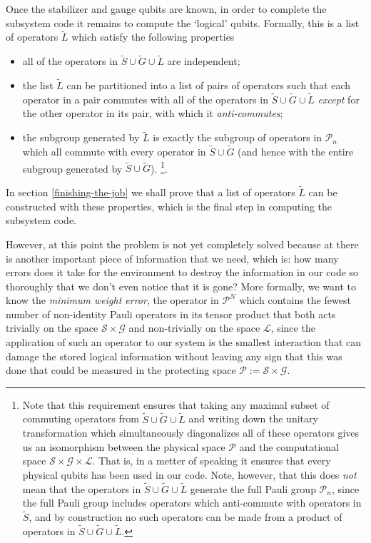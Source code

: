 \documentclass[twocolumn,showpacs,preprintnumbers,amsmath,amssymb,nofootinbib,pra,floatfix]{revtex4}
\begin{document}
Once the stabilizer and gauge qubits are known, in order to complete the subsystem code it remains to compute the `logical' qubits. Formally, this is a list of operators $\tilde L$ which satisfy the following properties
\begin{itemize}
\item all of the operators in $\tilde S \cup \tilde G \cup \tilde L$
  are independent;
\item the list $\tilde L$ can be partitioned into a list of pairs of
  operators such that each operator in a pair commutes with all of the
  operators in $\tilde S \cup \tilde G \cup \tilde L$ \emph{except}
  for the other operator in its pair, with which it
  \emph{anti-commutes};
\item the subgroup generated by $\tilde L$ is exactly the subgroup of operators in $\mathcal{P}_n$ which all commute with every operator in $\tilde S \cup \tilde G$  (and hence with the entire subgroup generated by $\tilde S \cup \tilde G$). \footnote{Note that this requirement ensures that taking any maximal subset of commuting operators from $\tilde S \cup \tilde G \cup \tilde L$ and writing down the unitary transformation which simultaneously diagonalizes all of these operators gives us an isomorphism between the physical space $\mathscr{P}$ and the computational space $\mathscr{S}\times\mathscr{G}\times\mathscr{L}$.  That is, in a metter of speaking it ensures that every physical qubits has been used in our code.  Note, however, that this does \emph{not} mean that the operators in $\tilde S \cup \tilde G \cup \tilde L$ generate the full Pauli group $\mathcal{P}_n$, since the full Pauli group includes operators which anti-commute with operators in $\tilde S$, and by construction no such operators can be made from a product of operators in $\tilde S \cup \tilde G \cup \tilde L$.}.
\end{itemize}
In section \ref{finishing-the-job} we shall prove that a list of operators $\tilde L$ can be constructed with these properties, which is the final step in computing the subsystem code.

However, at this point the problem is not yet completely solved because at there is another important piece of information that we need, which is:  how many errors does it take for the environment to destroy the information in our code so thoroughly that we don't even notice that it is gone?  More formally, we want to know the \emph{minimum weight error}, the operator in $\mathcal{P}^N$ which contains the fewest number of non-identity Pauli operators in its tensor product that both acts trivially on the space $\mathscr{S}\times\mathscr{G}$ and non-trivially on the space $\mathscr{L}$, since the application of such an operator to our system is the smallest interaction that can damage the stored logical information without leaving any sign that this was done that could be measured in the protecting space $\mathscr{P}:=\mathscr{S}\times\mathscr{G}$.
\end{document}
